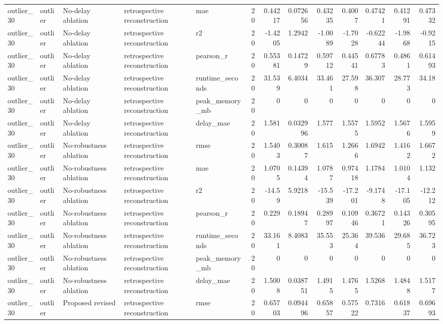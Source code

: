 \begin{table}[!htbp]
{{\begin{tabular}{lllllrrrrrrrr}
outlier_30 & outlier & No-delay ablation & retrospective reconstruction & mae & 20 & 0.44217 & 0.072656 & 0.43235 & 0.4007 & 0.47421 & 0.41291 & 0.47332 \\
outlier_30 & outlier & No-delay ablation & retrospective reconstruction & r2 & 20 & -1.4205 & 1.2942 & -1.0089 & -1.7028 & -0.62244 & -1.9868 & -0.9215 \\
outlier_30 & outlier & No-delay ablation & retrospective reconstruction & pearson_r & 20 & 0.55381 & 0.14729 & 0.59712 & 0.44541 & 0.67783 & 0.4861 & 0.61493 \\
outlier_30 & outlier & No-delay ablation & retrospective reconstruction & runtime_seconds & 20 & 31.539 & 6.4034 & 33.461 & 27.598 & 36.307 & 28.773 & 34.18 \\
outlier_30 & outlier & No-delay ablation & retrospective reconstruction & peak_memory_mb & 20 & 0 & 0 & 0 & 0 & 0 & 0 & 0 \\
outlier_30 & outlier & No-delay ablation & retrospective reconstruction & delay_mae & 20 & 1.581 & 0.032996 & 1.577 & 1.5575 & 1.5952 & 1.5676 & 1.5959 \\
outlier_30 & outlier & No-robustness ablation & retrospective reconstruction & rmse & 20 & 1.5403 & 0.30087 & 1.615 & 1.2666 & 1.6942 & 1.4162 & 1.6672 \\
outlier_30 & outlier & No-robustness ablation & retrospective reconstruction & mae & 20 & 1.0705 & 0.14394 & 1.0787 & 0.97418 & 1.1784 & 1.0104 & 1.132 \\
outlier_30 & outlier & No-robustness ablation & retrospective reconstruction & r2 & 20 & -14.59 & 5.9218 & -15.539 & -17.201 & -9.1748 & -17.105 & -12.212 \\
outlier_30 & outlier & No-robustness ablation & retrospective reconstruction & pearson_r & 20 & 0.229 & 0.18947 & 0.28997 & 0.10946 & 0.36721 & 0.14326 & 0.30595 \\
outlier_30 & outlier & No-robustness ablation & retrospective reconstruction & runtime_seconds & 20 & 33.161 & 8.4083 & 35.553 & 25.364 & 39.536 & 29.685 & 36.723 \\
outlier_30 & outlier & No-robustness ablation & retrospective reconstruction & peak_memory_mb & 20 & 0 & 0 & 0 & 0 & 0 & 0 & 0 \\
outlier_30 & outlier & No-robustness ablation & retrospective reconstruction & delay_mae & 20 & 1.5008 & 0.038751 & 1.4915 & 1.4765 & 1.5268 & 1.4848 & 1.5177 \\
outlier_30 & outlier & Proposed revised & retrospective reconstruction & rmse & 20 & 0.65703 & 0.094496 & 0.65857 & 0.57522 & 0.7316 & 0.61837 & 0.69693 \\

\end{tabular}}}
\end{table}

